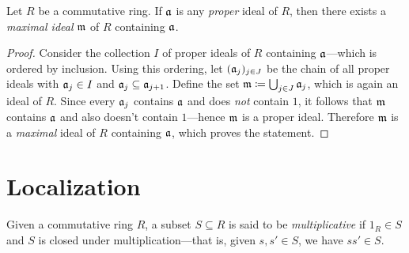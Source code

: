 \begin{proposition}
    \label{prop:commutative-rings-have-maximal-ideals}
    Let \(R\) be a commutative ring. If \(\mathfrak{a}\) is any \emph{proper} ideal of
    \(R\), then there exists a \emph{maximal ideal} \(\mathfrak{m}\) of \(R\) containing
    \(\mathfrak{a}\).
\end{proposition}

\begin{proof}
    Consider the collection \(I\) of proper ideals of \(R\) containing
    \(\mathfrak{a}\)---which is ordered by inclusion. Using this ordering, let
    \((\mathfrak{a}_j)_{j \in J}\) be the chain of all proper ideals with
    \(\mathfrak{a}_j \in I\) and \(\mathfrak{a}_j \subseteq \mathfrak{a}_{j+1}\). Define the set
    \(\mathfrak{m} \coloneq \bigcup_{j \in J} \mathfrak{a}_j\), which is again an ideal of
    \(R\). Since every \(\mathfrak{a}_j\) contains \(\mathfrak{a}\) and does \emph{not}
    contain \(1\), it follows that \(\mathfrak{m}\) contains \(\mathfrak{a}\) and also
    doesn't contain \(1\)---hence \(\mathfrak{m}\) is a proper ideal. Therefore
    \(\mathfrak{m}\) is a \emph{maximal} ideal of \(R\) containing \(\mathfrak{a}\), which
    proves the statement.
\end{proof}

\section{Localization}

\begin{definition}
    \label{def:multiplicative-subset}
    Given a commutative ring \(R\), a subset \(S \subseteq R\) is said to be
    \emph{multiplicative} if \(1_R \in S\) and \(S\) is closed under
    multiplication---that is, given \(s, s' \in S\), we have \(s s' \in S\).
\end{definition}

